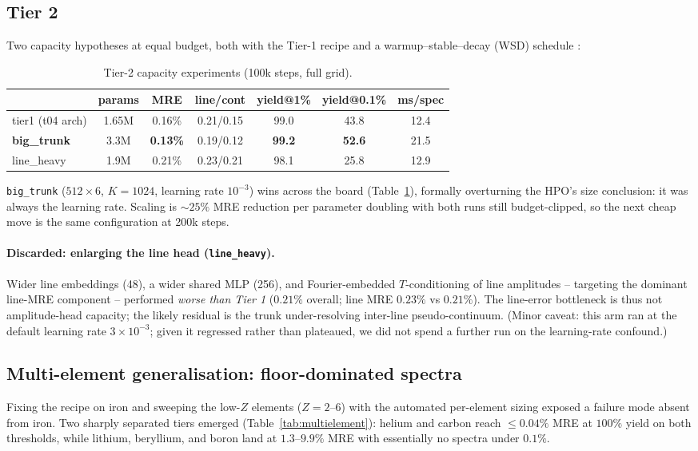 \documentclass[11pt,a4paper]{article}
\newcommand{\code}[1]{\texttt{#1}}
\begin{document}
\subsection{Tier 2}
Two capacity hypotheses at equal budget, both with the Tier-1 recipe
and a warmup--stable--decay (WSD) schedule \citep[flat learning rate,
linear decay over the final 15\%; extending a run re-pays only the
decay leg;][]{hu24} :

\begin{table}[ht]
\centering
\begin{tabular}{lcccccc}
\toprule
 & params & MRE & line/cont & yield@1\% & yield@0.1\% & ms/spec\\
\midrule
tier1 (t04 arch) & 1.65M & 0.16\% & 0.21/0.15 & 99.0 & 43.8 & 12.4\\
\textbf{big\_trunk} & 3.3M & \textbf{0.13\%} & 0.19/0.12 & \textbf{99.2}
& \textbf{52.6} & 21.5\\
line\_heavy & 1.9M & 0.21\% & 0.23/0.21 & 98.1 & 25.8 & 12.9\\
\bottomrule
\end{tabular}
\caption{Tier-2 capacity experiments (100k steps, full grid).}
\label{tab:tier2}
\end{table}

\code{big\_trunk} ($512\times6$, $K=1024$, learning rate $10^{-3}$)
wins across the board (Table~\ref{tab:tier2}), formally overturning the
HPO's size conclusion: it was always the learning rate. Scaling is
$\sim25\%$ MRE reduction per parameter doubling with both runs still
budget-clipped, so the next cheap move is the same configuration at
200k steps.

\paragraph{Discarded: enlarging the line head (\code{line\_heavy}).}
Wider line embeddings (48), a wider shared MLP (256), and
Fourier-embedded $T$-conditioning of line amplitudes -- targeting the
dominant line-MRE component -- performed \emph{worse than Tier 1}
($0.21\%$ overall; line MRE $0.23\%$ vs $0.21\%$). The line-error
bottleneck is thus not amplitude-head capacity; the likely residual is
the trunk under-resolving inter-line pseudo-continuum. (Minor caveat:
this arm ran at the default learning rate $3\times10^{-3}$; given it
regressed rather than plateaued, we did not spend a further run on the
learning-rate confound.)

\subsection{Multi-element generalisation: floor-dominated spectra}
\label{sec:multielement}
Fixing the recipe on iron and sweeping the low-$Z$ elements ($Z=2$--$6$)
with the automated per-element sizing exposed a failure mode absent from
iron. Two sharply separated tiers emerged (Table~\ref{tab:multielement}):
helium and carbon reach $\le0.04\%$ MRE at $100\%$ yield on both
thresholds, while lithium, beryllium, and boron land at $1.3$--$9.9\%$
MRE with essentially no spectra under $0.1\%$.
\end{document}
